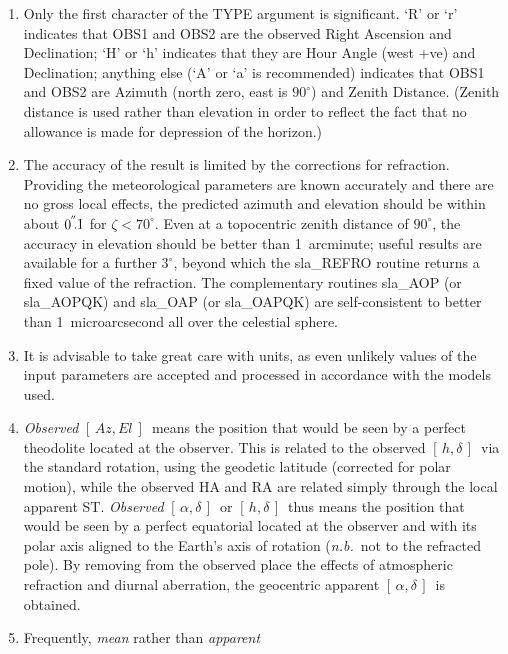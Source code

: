 \documentclass[11pt,twoside]{article}
\newcommand{\radec}     {$[\,\alpha,\delta\,]$}
\newcommand{\hadec}     {$[\,h,\delta\,]$}
\newcommand{\azel}      {$[\,Az,El~]$}
\newcommand{\arcsec}[2] {\arcseci{#1}$\hspace{-0.4em}.#2$}
\newcommand{\arcsec}[2] {
      {$#1\hspace{-0.05em}^{'\hspace{-0.1em}'}\hspace{-0.4em}.#2$}
   }
\newcommand{\arcseci}[1] {$#1\hspace{-0.05em}$\raisebox{-0.5ex}
                         {$^{'\hspace{-0.1em}'}$}}
\renewcommand{\arcseci}[1] {$#1\hspace{-0.05em}^{'\hspace{-0.1em}'}$}
\begin{document}
{
 \begin{enumerate}
  \item Only the first character of the TYPE argument is significant.
        `R' or `r' indicates that OBS1 and OBS2 are the observed Right
        Ascension and Declination;  `H' or `h' indicates that they are
        Hour Angle (west +ve) and Declination; anything else (`A' or
        `a' is recommended) indicates that OBS1 and OBS2 are Azimuth
        (north zero, east is $90^{\circ}$) and Zenith Distance.  (Zenith
        distance is used rather than elevation in order to reflect the
        fact that no allowance is made for depression of the horizon.)
  \item The accuracy of the result is limited by the corrections for
        refraction.  Providing the meteorological parameters are
        known accurately and there are no gross local effects, the
        predicted azimuth and elevation should be within about
        \arcsec{0}{1} for $\zeta<70^{\circ}$.  Even
        at a topocentric zenith distance of
        $90^{\circ}$, the accuracy in elevation should be better than
        1~arcminute;  useful results are available for a further
        $3^{\circ}$, beyond which the sla\_REFRO routine returns a
        fixed value of the refraction.  The complementary
        routines sla\_AOP (or sla\_AOPQK) and sla\_OAP (or sla\_OAPQK)
        are self-consistent to better than 1~microarcsecond all over
        the celestial sphere.
  \item It is advisable to take great care with units, as even
        unlikely values of the input parameters are accepted and
        processed in accordance with the models used.
  \item {\it Observed}\/ \azel\ means the position that would be seen by a
        perfect theodolite located at the observer.  This is
        related to the observed \hadec\ via the standard rotation, using
        the geodetic latitude (corrected for polar motion), while the
        observed HA and RA are related simply through the local
        apparent ST.  {\it Observed}\/ \radec\ or \hadec\ thus means the
        position that would be seen by a perfect equatorial located
        at the observer and with its polar axis aligned to the
        Earth's axis of rotation ({\it n.b.}\ not to the refracted pole).
        By removing from the observed place the effects of
        atmospheric refraction and diurnal aberration, the
        geocentric apparent \radec\ is obtained.
  \item Frequently, {\it mean}\/ rather than {\it apparent}\,

\end{enumerate}}
\end{document}
